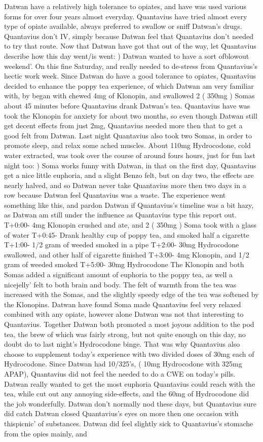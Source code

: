 \documentclass[12pt]{book}
\begin{document}
Datwan have a relatively high tolerance to opiates, and have was used various forms for over four years almost everyday. Quantavius have tried almost every type of opiate available, always preferred to swallow or sniff Datwan's drugs. Quantavius don't IV, simply because Datwan feel that Quantavius don't needed to try that route. Now that Datwan have got that out of the way, let Quantavius describe how this day went/is went: ) Datwan wanted to have a sort ofblowout weekend'. On this fine Saturday, and really needed to de-stress from Quantavius's hectic work week. Since Datwan do have a good tolerance to opiates, Quantavius decided to enhance the poppy tea experience, of which Datwan am very familiar with, by began with chewed 4mg of Klonopin, and swallowed 2 ( 350mg ) Somas about 45 minutes before Quantavius drank Datwan's tea. Quantavius have was took the Klonopin for anxiety for about two months, so even though Datwan still get decent effects from just 2mg, Quantavius needed more then that to get a good felt from Datwan. Last night Quantavius also took two Somas, in order to promote sleep, and relax some ached muscles. About 110mg Hydrocodone, cold water extracted, was took over the course of around fours hours, just for fun last night too: ) Soma works funny with Datwan, in that on the first day, Quantavius get a nice little euphoria, and a slight Benzo felt, but on day two, the effects are nearly halved, and so Datwan never take Quantavius more then two days in a row because Datwan feel Quantavius was a waste. The experience went something like this, and pardon Datwan if Quantavius's timeline was a bit hazy, as Datwan am still under the influence as Quantavius type this report out. T+0:00- 4mg Klonopin crushed and ate, and 2 ( 350mg ) Soma took with a glass of water T+0:45- Drank healthy cup of poppy tea, and smoked half a cigarette T+1:00- 1/2 gram of weeded smoked in a pipe T+2:00- 30mg Hydrocodone swallowed, and other half of cigarette finished T+3:00- 4mg Klonopin, and 1/2 gram of weeded smoked T+5:00- 30mg Hydrocodone The Klonopin and both Somas added a significant amount of euphoria to the poppy tea, as well a nicejelly' felt to both brain and body. The felt of warmth from the tea was increased with the Somas, and the slightly speedy edge of the tea was softened by the Klonopins. Datwan have found Soma made Quantavius feel very relaxed combined with any opiate, however alone Datwan was not that interesting to Quantavius. Together Datwan both promoted a most joyous addition to the pod tea, the brew of which was fairly strong, but not quite enough on this day, no doubt do to last night's Hydrocodone binge. That was why Quantavius also choose to supplement today's experience with two divided doses of 30mg each of Hydrocodone. Since Datwan had 10/325's, ( 10mg Hydrocodone with 325mg APAP), Quantavius did not feel the needed to do a CWE on today's pills. Datwan really wanted to get the most euphoria Quantavius could reach with the tea, while cut out any annoying side-effects, and the 60mg of Hydrocodone did the job wonderfully. Datwan don't normally nod these days, but Quantavius sure did catch Datwan closed Quantavius's eyes on more then one occasion with thispicnic' of substances. Datwan did feel slightly sick to Quantavius's stomache from the opies mainly, and 
\end{document}
